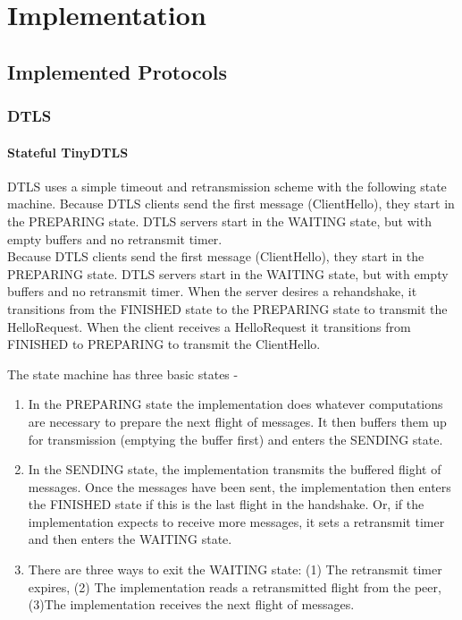 \chapter{Implementation}

\section{Implemented Protocols}

\subsection{DTLS}

\subsubsection{Stateful TinyDTLS}
DTLS uses a simple timeout and retransmission scheme with the following state machine.  Because DTLS clients send the first message (ClientHello), they start in the PREPARING state.  DTLS servers start in the WAITING state, but with empty buffers and no retransmit timer.\\
Because DTLS clients send the first message (ClientHello), they start in the PREPARING state.  DTLS servers start in the WAITING state, but with empty buffers and no retransmit timer. When the server desires a rehandshake, it transitions from the FINISHED state to the PREPARING state to transmit the HelloRequest. When the client receives a HelloRequest it transitions from FINISHED to PREPARING to transmit the ClientHello.


The state machine has three basic states - \\
\begin{enumerate}
    \item  In the PREPARING state the implementation does whatever computations are necessary to prepare the next flight of messages.  It then buffers them up for transmission (emptying the buffer first) and enters the SENDING state.

\item In the SENDING state, the implementation transmits the buffered flight of messages.  Once the messages have been sent, the implementation then enters the FINISHED state if this is the last flight in the handshake.  Or, if the implementation expects to receive more messages, it sets a retransmit timer and then enters the WAITING state.

\item There are three ways to exit the WAITING state: (1) The retransmit timer expires, (2) The implementation reads a retransmitted flight from the peer, (3)The implementation receives the next flight of messages.
\end{enumerate}  



